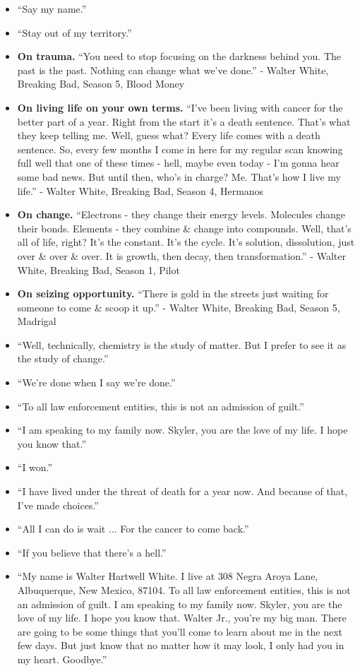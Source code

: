 \documentclass{article}
\begin{document}
\begin{enumerate}
\begin{itemize}
		\item ``Say my name.''
		\item ``Stay out of my territory.''
		\item {\bf On trauma.} ``You need to stop focusing on the darkness behind you. The past is the past. Nothing can change what we've done.'' - Walter White, Breaking Bad, Season 5, Blood Money
		\item {\bf On living life on your own terms.} ``I've been living with cancer for the better part of a year. Right from the start it's a death sentence. That's what they keep telling me. Well, guess what? Every life comes with a death sentence. So, every few months I come in here for my regular scan knowing full well that one of these times - hell, maybe even today - I'm gonna hear some bad news. But until then, who's in charge? Me. That's how I live my life.'' - Walter White, Breaking Bad, Season 4, Hermanos
		\item {\bf On change.} ``Electrons - they change their energy levels. Molecules change their bonds. Elements - they combine \& change into compounds. Well, that's all of life, right? It's the constant. It's the cycle. It's solution, dissolution, just over \& over \& over. It is growth, then decay, then transformation.'' - Walter White, Breaking Bad, Season 1, Pilot
		\item {\bf On seizing opportunity.} ``There is gold in the streets just waiting for someone to come \& scoop it up.'' - Walter White, Breaking Bad, Season 5, Madrigal
		\item ``Well, technically, chemistry is the study of matter. But I prefer to see it as the study of change.''
		\item ``We're done when I say we're done.''
		\item ``To all law enforcement entities, this is not an admission of guilt.''
		\item ``I am speaking to my family now. Skyler, you are the love of my life. I hope you know that.''
		\item ``I won.''
		\item ``I have lived under the threat of death for a year now. And because of that, I've made choices.''
		\item ``All I can do is wait $\ldots$ For the cancer to come back.''
		\item ``If you believe that there's a hell.''
		\item ``My name is Walter Hartwell White. I live at 308 Negra Aroya Lane, Albuquerque, New Mexico, 87104. To all law enforcement entities, this is not an admission of guilt. I am speaking to my family now. Skyler, you are the love of my life. I hope you know that. Walter Jr., you're my big man. There are going to be some things that you'll come to learn about me in the next few days. But just know that no matter how it may look, I only had you in my heart. Goodbye.''

\end{itemize}
\end{enumerate}
\end{document}
